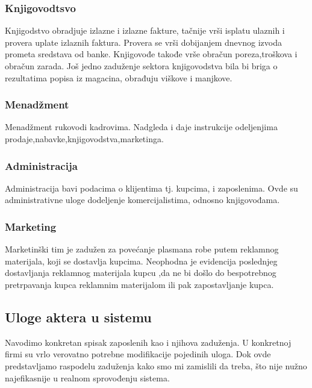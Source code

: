 \subsubsection{Knjigovodtsvo}

Knjigodstvo obradjuje izlazne i izlazne fakture, tačnije vrši isplatu ulaznih i provera uplate izlaznih faktura. Provera se vrši dobijanjem dnevnog izvoda prometa sredstava od banke. Knjigovođe takođe vrše obračun poreza,troškova i obračun zarada. Još jedno zaduženje sektora knjigovodstva bila bi briga o rezultatima popisa iz magacina, obrađuju viškove i manjkove.

\subsubsection{Menadžment}
Menadžment rukovodi kadrovima. Nadgleda i daje instrukcije odeljenjima 
prodaje,nabavke,knjigovodstva,marketinga.

\subsubsection{Administracija}
Administracija bavi podacima o klijentima tj. kupcima, i zaposlenima. Ovde su administrativne uloge dodeljenje komercijalistima, odnosno knjigovođama.

\subsubsection{Marketing}
Marketinški tim je zadužen za povećanje plasmana robe putem reklamnog materijala, koji se dostavlja kupcima. Neophodna je evidencija poslednjeg dostavljanja reklamnog materijala kupcu ,da ne bi došlo do bespotrebnog pretrpavanja kupca reklamnim materijalom ili pak zapostavljanje kupca.

\subsection{Uloge aktera u sistemu}
Navodimo konkretan spisak zaposlenih kao i njihova zaduženja. U konkretnoj firmi su vrlo verovatno potrebne modifikacije pojedinih uloga. Dok ovde predstavljamo raspodelu zaduženja kako smo mi zamislili da treba, što nije nužno najefikasnije u realnom sprovođenju sistema. 

